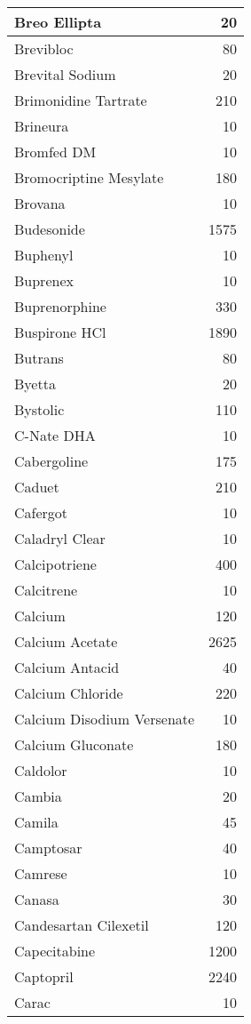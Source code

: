 \documentclass[
]{article}
\begin{document}
\begin{table}
\begin{tabular}[t]{l|r}
\hline
Breo Ellipta & 20\\
\hline
Brevibloc & 80\\
\hline
Brevital Sodium & 20\\
\hline
Brimonidine Tartrate & 210\\
\hline
Brineura & 10\\
\hline
Bromfed DM & 10\\
\hline
Bromocriptine Mesylate & 180\\
\hline
Brovana & 10\\
\hline
Budesonide & 1575\\
\hline
Buphenyl & 10\\
\hline
Buprenex & 10\\
\hline
Buprenorphine & 330\\
\hline
Buspirone HCl & 1890\\
\hline
Butrans & 80\\
\hline
Byetta & 20\\
\hline
Bystolic & 110\\
\hline
C-Nate DHA & 10\\
\hline
Cabergoline & 175\\
\hline
Caduet & 210\\
\hline
Cafergot & 10\\
\hline
Caladryl Clear & 10\\
\hline
Calcipotriene & 400\\
\hline
Calcitrene & 10\\
\hline
Calcium & 120\\
\hline
Calcium Acetate & 2625\\
\hline
Calcium Antacid & 40\\
\hline
Calcium Chloride & 220\\
\hline
Calcium Disodium Versenate & 10\\
\hline
Calcium Gluconate & 180\\
\hline
Caldolor & 10\\
\hline
Cambia & 20\\
\hline
Camila & 45\\
\hline
Camptosar & 40\\
\hline
Camrese & 10\\
\hline
Canasa & 30\\
\hline
Candesartan Cilexetil & 120\\
\hline
Capecitabine & 1200\\
\hline
Captopril & 2240\\
\hline
Carac & 10\\
\hline

\end{tabular}
\end{table}
\end{document}
